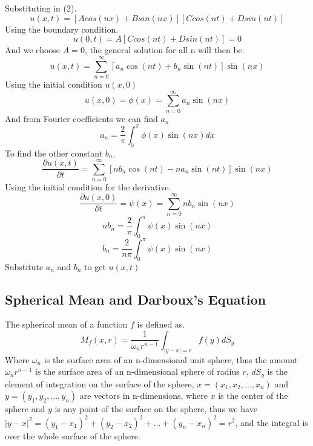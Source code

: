 Substituting in (2).
\[
    u\left(x,t\right) = \left[Acos\left(nx\right)+Bsin\left(nx\right)\right]\left[Ccos\left(nt\right)+Dsin\left(nt\right)\right]    
\]
Using the boundary condition.
\[
    u\left(0,t\right) = A\left[Ccos\left(nt\right)+Dsin\left(nt\right)\right]=0    
\]
And we choose $A=0$, the general solution for all n will then be.
\[
    u\left(x,t\right) = \sum_{n=0}^{\infty}\left[a_{n}\cos\left(nt\right)+b_{n}\sin\left(nt\right)\right]\sin\left(nx\right)    
\]
Using the initial condition $u(x,0)$
\[
    u\left(x,0\right) = \phi\left(x\right) = \sum_{n=0}^{\infty}a_{n}\sin\left(nx\right)    
\]
And from Fourier coefficients we can find $a_n$
\[
    a_n = \frac{2}{\pi}\int_{0}^{\pi}\phi\left(x\right)\sin\left(nx\right)dx    
\]
To find the other constant $b_{n}$.
\[
    \frac{\partial u\left(x,t\right)}{\partial t} = \sum_{n=0}^{\infty}\left[nb_{n}\cos\left(nt\right)-na_{n}\sin\left(nt\right)\right]\sin\left(nx\right)    
\]
Using the initial condition for the derivative.
\[
    \frac{\partial u\left(x,0\right)}{\partial t} = \psi\left(x\right)= \sum_{n=0}^{\infty}nb_{n}\sin\left(nx\right)    
\]
\[
    nb_n = \frac{2}{\pi} \int_{0}^{\pi}\psi\left(x\right)\sin\left(nx\right)    
\]
\[
    b_n = \frac{2}{n\pi} \int_{0}^{\pi}\psi\left(x\right)\sin\left(nx\right)    
\]
Substitute $a_n$ and $b_n$ to get $u\left(x,t\right)$

\setcounter{equation}{0}
\subsection{Spherical Mean and Darboux's Equation}
The spherical mean of a function $f$ is defined as.
\begin{equation}
M_{f}(x,r) = \frac{1}{\omega_{n}r^{n-1}} \int_{|y-x|=r} f(y)dS_y
\end{equation}
Where $\omega_{n}$ is the surface area of an n-dimensional unit sphere, thus the amount $\omega_{n}r^{n-1}$ is the surface area of an n-dimensional sphere of radius $r$, $dS_y$ is the element of integration on the surface of the sphere, $x = (x_{1},x_{2}, \dots,x_{n})$ and $y = (y_{1},y_{2}, \dots,y_{n})$ are vectors in n-dimensions, where $x$ is the center of the sphere and $y$ is any point of the surface on the sphere, thus we have $|y-x|^2 = {(y_{1}-x_{1})}^2 + {(y_{2}-x_{2})}^2 + \dots + {(y_{n}-x_{n})}^2 = r^2$, and the integral is over the whole surface of the sphere.

